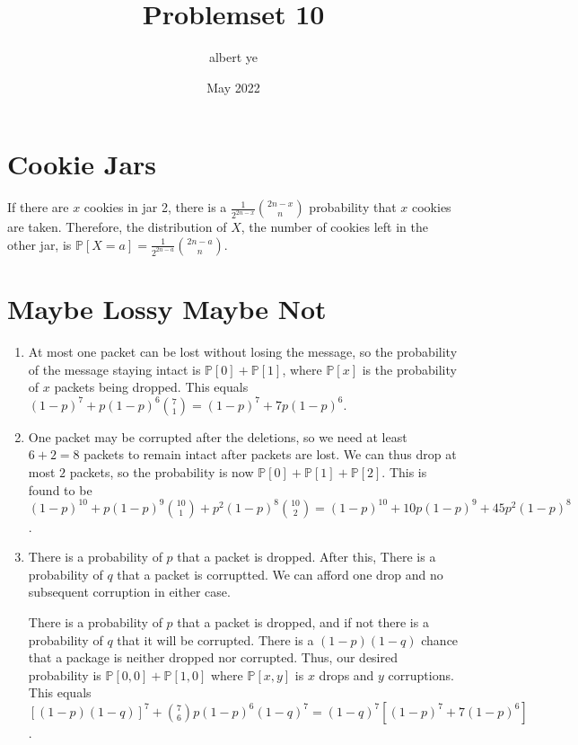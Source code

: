\documentclass{article}
\title{Problemset 10}
\author{albert ye}
\date{May 2022}
\newcommand{\p}{\mathbb{P}}
\begin{document}
\maketitle
\section{Cookie Jars}
If there are $x$ cookies in jar 2, there is a $\frac{1}{2^{2n-x}} \binom{2n-x}{n}$
probability that $x$ cookies are taken. Therefore, the distribution of $X$, the 
number of cookies left in the other jar, is $\p[X = a] = \boxed{\frac{1}{2^{2n-a}}
\binom{2n-a}{n}}$.

\section{Maybe Lossy Maybe Not}
\begin{enumerate}[label=(\alph*)]
	\item At most one packet can be lost without losing the message, so the
	probability of the message staying intact is $\p[0] + \p[1]$, where 
	$\p[x]$ is the probability of $x$ packets being dropped. This equals 
	$(1-p)^7 + p(1-p)^6 \binom{7}{1} = \boxed{(1-p)^7 + 7p(1-p)^6}$.
	\item One packet may be corrupted after the deletions, so we need at least
	$6+2 = 8$ packets to remain intact after packets are lost. We can thus drop 
	at most $2$ packets, so the probability is now $\p[0] + \p[1] + \p[2]$.
	This is found to be $(1-p)^{10} + p(1-p)^9 \binom{10}{1} + p^2(1-p)^8
	\binom{10}{2} = \boxed{(1-p)^{10} + 10p(1-p)^9 + 45p^2(1-p)^8}$.
	\item There is a probability of $p$ that a packet is dropped. After this, There
	is a probability of $q$ that a packet is corruptted. We can afford one drop 
	and no subsequent corruption in either case. 

	There is a probability of $p$ that a packet is dropped, and if not there is a
	probability of $q$ that it will be corrupted. There is a $(1-p)(1-q)$ chance 
	that a package is neither dropped nor corrupted. Thus, our desired probability 
	is $\p[0,0] + \p[1,0]$ where $\p[x,y]$ is $x$ drops and $y$ corruptions. 
	This equals $[(1-p)(1-q)]^7 + \binom{7}{6} p(1-p)^6(1-q)^7 = 
	\boxed{(1-q)^7[(1-p)^7 + 7(1-p)^6]}$.
\end{enumerate}

\newpage
\end{document}
